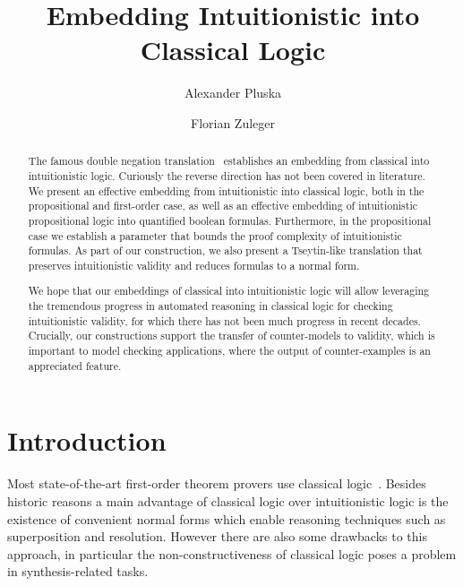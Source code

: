 \documentclass[a4paper,UKenglish,cleveref, autoref, thm-restate]{lipics-v2021}
\title{Embedding Intuitionistic into Classical Logic} %
\author{Alexander {Pluska}}{Faculty of Mathematics, Universtät Wien, Austria}{e11941874@student.tuwien.ac.at}{https://orcid.org/my-orcid?orcid=0000-0002-7709-3335}{}%
\author{Florian Zuleger}{Institute of Logic and Computation, Technische Universität Wien, Austria}{florian.zuleger@tuwien.ac.at}{https://orcid.org/0000-0003-1468-8398}{}
\begin{document}
\maketitle

\begin{abstract}
The famous double negation translation~\cite{glivenko1929quelques, godel1933intuitionistischen} establishes an embedding from classical into intuitionistic logic. Curiously the reverse direction has not been covered in literature. We present an effective embedding from intuitionistic into classical logic, both in the propositional and first-order case, as well as an effective embedding of intuitionistic propositional logic into quantified boolean formulas.
Furthermore, in the propositional case we establish a parameter that bounds the proof complexity of intuitionistic formulas. As part of our construction, we also present a Tseytin-like translation that preserves intuitionistic validity and reduces formulas to a normal form. 



We hope that our embeddings of classical into intuitionistic logic will allow leveraging the tremendous progress in automated reasoning in classical logic for checking intuitionistic validity, for which there has not been much progress in recent decades. Crucially, our constructions support the transfer of counter-models to validity, which is important to model checking applications, where the output of counter-examples is an appreciated feature.
\end{abstract}

\section{Introduction}

Most state-of-the-art first-order theorem provers use classical logic~\cite{kovacs2013first, schulz2002brainiac, korovin2008iprover}. Besides historic reasons a main advantage of classical logic over intuitionistic logic is the existence of convenient normal forms which enable reasoning techniques such as superposition and resolution. However there are also some drawbacks to this approach, in particular the non-constructiveness of classical logic poses a problem in synthesis-related tasks.
\end{document}

